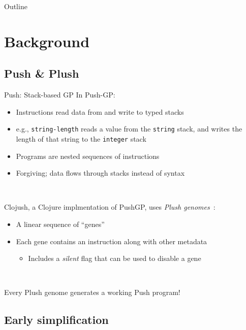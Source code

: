 \documentclass{beamer}
\begin{document}
\begin{frame}{Outline}
  \tableofcontents[hideallsubsections]
\end{frame}


\section{Background}

\subsection{Push \& Plush}

\begin{frame}{Push: Stack-based GP}
In Push-GP:
\begin{itemize}
	\item Instructions read data from and write to typed stacks
	\item e.g., \texttt{string-length} reads a value from the \texttt{string} stack, and writes the length of that string to the \texttt{integer} stack
	\item Programs are nested sequences of instructions
	\item Forgiving; data flows through stacks instead of syntax
\end{itemize}

~

Clojush, a Clojure implmentation of PushGP, uses \emph{Plush genomes}~\cite{Helmuth:2016:GPTP}:
\begin{itemize}
	\item A linear sequence of ``genes''
	\item Each gene contains an instruction along with other metadata
	\begin{itemize}
		\item Includes a \emph{silent} flag that can be used to disable a gene
	\end{itemize}
\end{itemize}

~

Every Plush genome generates a working Push program!

\end{frame}

\subsection{Early simplification}
\end{document}
